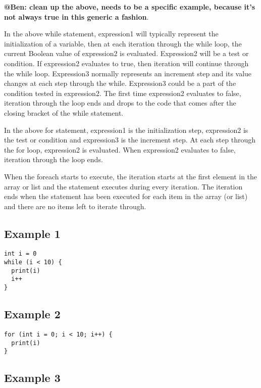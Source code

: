 \documentclass{book}
\begin{document}
\textbf{@Ben: clean up the above, needs to be a specific example, because it's not
always true in this generic a fashion}.

In the above while statement, expression1 will typically represent the
initialization of a variable, then at each iteration through the while loop, the
current Boolean value of expression2 is evaluated. Expression2 will be a test or
condition. If expression2 evaluates to true, then iteration will continue through
the while loop. Expression3 normally represents an increment step and its value
changes at each step through the while. Expression3 could be a part of the
condition tested in expression2. The first time expression2 evaluates to false,
iteration through the loop ends and drops to the code that comes after the closing
bracket of the while statement.

In the above for statement, expression1 is the initialization step, expression2 is
the test or condition and expression3 is the increment step. At each step through
the for loop, expression2 is evaluated. When expression2 evaluates to false,
iteration through the loop ends.

When the foreach starts to execute, the iteration starts at the first element in
the array or list and the statement executes during every iteration. The iteration
ends when the statement has been executed for each item in the array (or list) and
there are no items left to iterate through.

\subsection{Example 1} %
\label{sub:example_1}

\begin{verbatim}
int i = 0
while (i < 10) {
  print(i)
  i++
}
\end{verbatim}


\subsection{Example 2} %
\label{sub:example_2}

\begin{verbatim}
for (int i = 0; i < 10; i++) {
  print(i)
}
\end{verbatim}


\subsection{Example 3} %
\label{sub:example_3}
\end{document}
